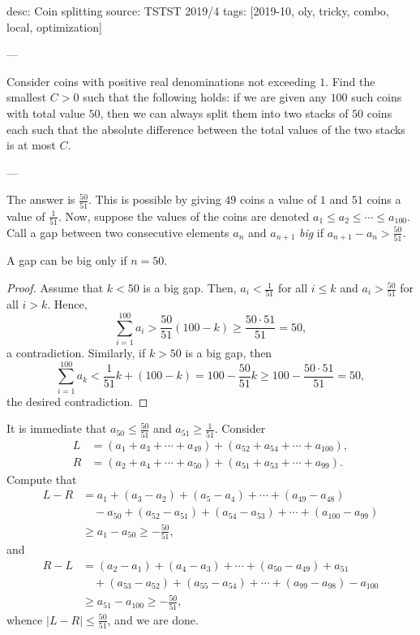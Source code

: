 desc: Coin splitting
source: TSTST 2019/4
tags: [2019-10, oly, tricky, combo, local, optimization]

---

Consider coins with positive real denominations not exceeding $1$. Find the smallest $C>0$ such that the following holds: if we are given any $100$ such coins with total value $50$, then we can always split them into two stacks of $50$ coins each such that the absolute difference between the total values of the two stacks is at most $C$.

---

The answer is $\tfrac{50}{51}$. This is possible by giving $49$ coins a value of $1$ and $51$ coins a value of $\tfrac1{51}$. Now, suppose the values of the coins are denoted $a_1\le a_2\le\cdots\le a_{100}$. Call a gap between two consecutive elements $a_n$ and $a_{n+1}$ \emph{big} if $a_{n+1}-a_n>\tfrac{50}{51}$.
\begin{iclaim*}
    A gap can be big only if $n=50$.
\end{iclaim*}
\begin{proof}
    Assume that $k<50$ is a big gap. Then, $a_i<\tfrac1{51}$ for all $i\le k$ and $a_i>\tfrac{50}{51}$ for all $i>k$. Hence, \[\sum_{i=1}^{100}a_i>\frac{50}{51}(100-k)\ge\frac{50\cdot51}{51}=50,\]
    a contradiction. Similarly, if $k>50$ is a big gap, then \[\sum_{i=1}^{100}a_k<\frac1{51}k+(100-k)=100-\frac{50}{51}k\ge100-\frac{50\cdot 51}{51}=50,\]
    the desired contradiction.
\end{proof}

It is immediate that $a_{50}\le\tfrac{50}{51}$ and $a_{51}\ge\tfrac1{51}$. Consider
\begin{align*}
    L&=(a_1+a_3+\cdots+a_{49})+(a_{52}+a_{54}+\cdots+a_{100}),\\
    R&=(a_2+a_4+\cdots+a_{50})+(a_{51}+a_{53}+\cdots+a_{99}).
\end{align*}
Compute that
\begin{align*}
    L-R&=a_1+(a_3-a_2)+(a_5-a_4)+\cdots+(a_{49}-a_{48})\\
    &\quad-a_{50}+(a_{52}-a_{51})+(a_{54}-a_{53})+\cdots+(a_{100}-a_{99})\\
    &\ge a_1-a_{50}\ge-\frac{50}{51},
\end{align*}
and
\begin{align*}
    R-L&=(a_2-a_1)+(a_4-a_3)+\cdots+(a_{50}-a_{49})+a_{51}\\
    &\quad+(a_{53}-a_{52})+(a_{55}-a_{54})+\cdots+(a_{99}-a_{98})-a_{100}\\
    &\ge a_{51}-a_{100}\ge-\frac{50}{51},
\end{align*}
whence $|L-R|\le\tfrac{50}{51}$, and we are done.
